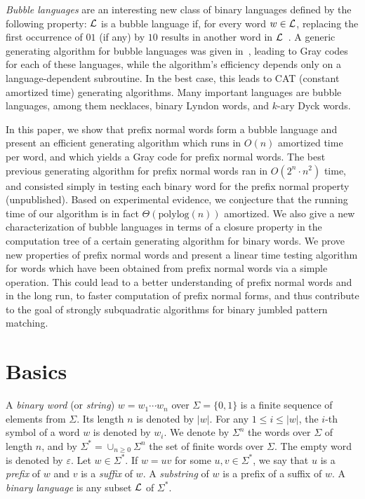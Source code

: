 \documentclass[11pt,a4paper]{llncs}
\def\polylog{\mathrm{polylog}}
\renewcommand{\epsilon}{\varepsilon}
\begin{document}
{\em Bubble languages} are an interesting new class of binary languages defined by the following property: ${\cal L}$ is a bubble language if, for every word $w \in {\cal L}$, replacing the first occurrence of $01$ (if any)  by $10$ results in another word in ${\cal L}$~\cite{RSW12,Ruskey12,SW12}. A generic generating algorithm for bubble languages was given in~\cite{SW12}, leading to Gray codes for each of these languages, while the algorithm's efficiency depends only on a language-dependent subroutine. In the best case, this leads to CAT (constant amortized time) generating algorithms. Many important languages are bubble languages, among them necklaces, binary Lyndon words, and $k$-ary Dyck words. 




In this paper, we show that prefix normal words form a bubble language and present an efficient generating algorithm which runs in $O(n)$ amortized time per word, and which yields a Gray code for prefix normal words. The best previous generating algorithm for prefix normal words ran in $O(2^n \cdot n^2)$ time, and consisted simply in testing each binary word for the prefix normal property (unpublished). Based on experimental evidence, we conjecture that the running time of our algorithm is in fact  $\Theta(\polylog(n))$ amortized. We also give a new characterization of bubble languages in terms of a closure property in the computation tree of a certain generating algorithm for binary words. 
We prove new properties of prefix normal words and present a linear time testing algorithm for words which have been obtained from prefix normal words via a simple operation. This could lead to a better understanding of prefix normal words and in the long run, to faster  computation of prefix normal forms, and thus contribute to the goal of strongly subquadratic algorithms for binary jumbled pattern matching.



\section{Basics}


A {\em binary word} (or {\em string}) $w=w_1\cdots w_n$ over $\Sigma=\{0,1\}$ is a finite sequence of elements from $\Sigma$. Its length $n$ is denoted by $|w|$. For any $1\leq i\leq |w|$, the $i$-th symbol of a word $w$ is denoted by $w_{i}$. 
We denote by $\Sigma^n$ the words over $\Sigma$ of length $n$, and by $\Sigma^{*} = \cup_{n\geq 0} \Sigma^n$ the set of finite words  over $\Sigma$. The empty word is denoted by $\epsilon$. 
Let $w\in \Sigma^{*}$. If $w=uv$ for some $u,v\in\Sigma^{*}$, we say that $u$ is a \emph{prefix} of $w$ and $v$ is a \emph{suffix} of $w$. A \emph{substring} of $w$ is a prefix of a suffix of $w$. A {\em binary language} is any subset $\cal L$ of $\Sigma^*$.
\end{document}
